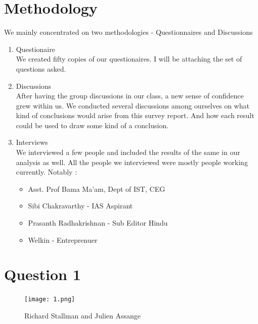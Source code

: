 \documentclass[11pt]{book}
\begin{document}
\chapter{Methodology}
We mainly concentrated on two methodologies - Questionnaires and Discussions
\begin{enumerate}
	\item Questionaire \\We created fifty copies of our questionaires. I will be attaching the set of questions asked. 
	\item Discussions \\After having the group discussions in our class, a new sense of confidence grew within us. 
		We conducted several discussions among ourselves on what kind of conclusions would arise from this survey report. 
		And how each result could be used to draw some kind of a conclusion. 
	\item Interviews \\We interviewed a few people and included the results of the same in our analysis as well. 
		All the people we interviewed were mostly people working currently. Notably : 
		\begin{itemize}
			\item Asst. Prof Bama Ma'am, Dept of IST, CEG
			\item Sibi Chakravarthy - IAS Aspirant
			\item Prasanth Radhakrishnan - Sub Editor Hindu
			\item Welkin - Entreprenuer
		\end{itemize}
\end {enumerate}
\chapter{Question 1}

\begin{figure}[ht!]
	\centering
	\texttt{[image: 1.png]}
	\caption{Richard Stallman and Julien Assange}
	\label{overflow}
\end{figure}
\\\textbf{}

\newpage
\end{document}
